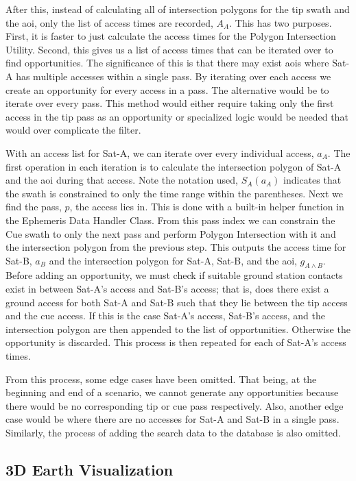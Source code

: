 After this, instead of calculating all of intersection polygons for the tip
swath and the \gls{aoi}, only the list of access times are recorded, $A_A$.
This has two purposes.  First, it is faster to just calculate the access times
for the Polygon Intersection Utility. Second, this gives us a list of access
times that can be iterated over to find opportunities. The significance of this
is that there may exist \glspl{aoi} where Sat-A has multiple accesses within a
single pass. By iterating over each access we create an opportunity for every
access in a pass.  The alternative would be to iterate over every pass. This
method would either require taking only the first access in the tip pass as an
opportunity or specialized logic would be needed that would over complicate the
filter.

With an access list for Sat-A, we can iterate over every individual access,
$a_A$. The first operation in each iteration is to calculate the intersection
polygon of Sat-A and the \gls{aoi} during that access. Note the notation used,
$S_A(a_A)$ indicates that the swath is constrained to only the time range
within the parentheses. Next we find the pass, $p$, the access lies in.  This
is done with a built-in helper function in the Ephemeris Data Handler Class.
From this pass index we can constrain the Cue swath to only the next pass and perform
Polygon Intersection with it and the intersection polygon from the previous
step. This outputs the access time for Sat-B, $a_B$ and the intersection
polygon for Sat-A, Sat-B, and the \gls{aoi}, $g_{A \wedge B}$. Before adding an
opportunity, we must check if suitable ground station contacts exist in between
Sat-A's access and Sat-B's access; that is, does there exist a ground access
for both Sat-A and Sat-B such that they lie between the tip access and the cue
access.  If this is the case Sat-A's access, Sat-B's access, and the
intersection polygon are then appended to the list of opportunities.  Otherwise
the opportunity is discarded.  This process is then repeated for each of
Sat-A's access times.

From this process, some edge cases have been omitted. That being, at the
beginning and end of a scenario, we cannot generate any opportunities because
there would be no corresponding tip or cue pass respectively. Also, another
edge case would be where there are no accesses for Sat-A and Sat-B in a single
pass. Similarly, the process of adding the search data to the database is also
omitted.


\subsection{3D Earth Visualization}

